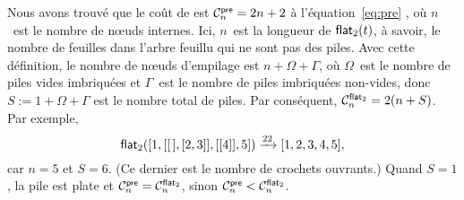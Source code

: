 Nous avons trouvé que le coût de 
est \(\C{\fun{pre}}{n} = 2n+2\) à
l'équation~\eqref{eq:pre} , où \(n\)~est le nombre de
nœuds internes. Ici, \(n\)~est la longueur de
\(\fun{flat}_2(t)\), à savoir, le
nombre de feuilles dans l'arbre feuillu qui ne sont pas des
piles. Avec cette définition, le nombre de nœuds d'empilage est
\(n + \Omega + \Gamma\), où \(\Omega\)~est le nombre de piles vides
imbriquées et \(\Gamma\)~est le nombre de piles imbriquées non-vides,
donc \(S := 1 + \Omega + \Gamma\) est le nombre total de piles. Par
conséquent, \(\C{\fun{flat}_2}{n} = 2(n +
S)\). Par exemple,
\begin{equation*}
\fun{flat}_2([1,[\el,[2,3]],[[4]],5]) \xrightarrow{22} [1,2,3,4,5],
\end{equation*}
car \(n=5\) et \(S=6\). (Ce dernier est le nombre de crochets
ouvrants.)  Quand \(S=1\), la pile est plate et \(\C{\fun{pre}}{n} =
\C{\fun{flat}_2}{n}\), sinon \(\C{\fun{pre}}{n} <
\C{\fun{flat}_2}{n}\).

\label{inorder}


